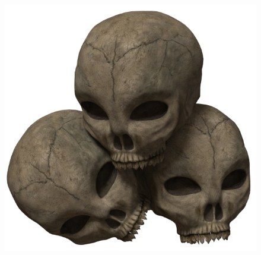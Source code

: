 \vspace{3em}

\begin{figure}[b]
\begin{center}
\includegraphics[scale=0.18]{img/SkullPile.png}
\end{center}
\end{figure}


